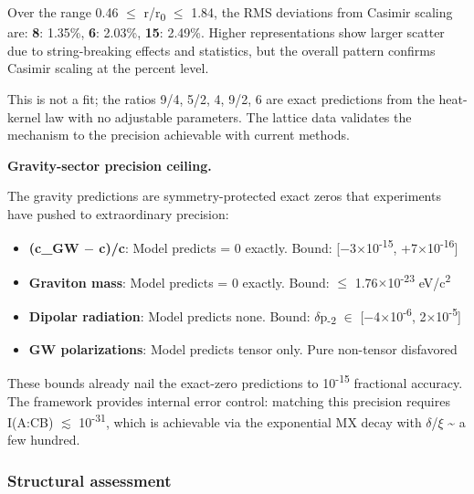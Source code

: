 \documentclass[11pt,a4paper]{article}
\theoremstyle{remark}
\providecommand{\tightlist}{%
  \setlength{\itemsep}{0pt}\setlength{\parskip}{0pt}}
\begin{document}
Over the range 0.46 \ensuremath{\leq} r/r\textsubscript{0} \ensuremath{\leq} 1.84, the RMS deviations from Casimir scaling are: \textbf{8}: 1.35\%, \textbf{6}: 2.03\%, \textbf{15}: 2.49\%. Higher representations show larger scatter due to string-breaking effects and statistics, but the overall pattern confirms Casimir scaling at the percent level.

This is not a fit; the ratios 9/4, 5/2, 4, 9/2, 6 are exact predictions from
the heat-kernel law with no adjustable parameters. The lattice data validates
the mechanism to the precision achievable with current methods.

\textbf{Gravity-sector precision ceiling.}

The gravity predictions are symmetry-protected exact zeros that experiments
have pushed to extraordinary precision:

\begin{itemize}
\tightlist
\item
  \textbf{(c\_GW \ensuremath{-} c)/c}: Model predicts = 0 exactly. Bound: {[}\ensuremath{-}3\ensuremath{\times}10\textsuperscript{-15}, +7\ensuremath{\times}10\textsuperscript{-16}{]}
\item
  \textbf{Graviton mass}: Model predicts = 0 exactly. Bound: \ensuremath{\leq} 1.76\ensuremath{\times}10\textsuperscript{-23} eV/c\textsuperscript{2}
\item
  \textbf{Dipolar radiation}: Model predicts none. Bound: \ensuremath{\delta}p\textsubscript{-2} \ensuremath{\in} {[}\ensuremath{-}4\ensuremath{\times}10\textsuperscript{-6}, 2\ensuremath{\times}10\textsuperscript{-5}{]}
\item
  \textbf{GW polarizations}: Model predicts tensor only. Pure non-tensor disfavored
\end{itemize}

These bounds already nail the exact-zero predictions to 10\textsuperscript{-15} fractional
accuracy. The framework provides internal error control: matching this
precision requires I(A:C\textbar B) \ensuremath{\lesssim} 10\textsuperscript{-31}, which is achievable via the
exponential MX decay with \ensuremath{\delta}/\ensuremath{\xi} \textasciitilde{} a few hundred.

\subsubsection{Structural assessment}\label{structural-assessment}
\end{document}
